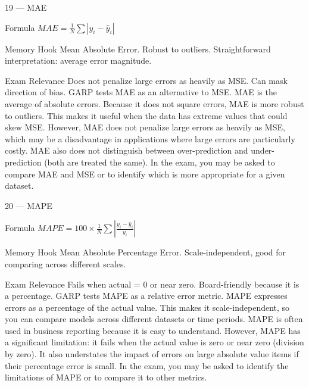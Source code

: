 \documentclass[aspectratio=169,8pt]{beamer}
\begin{document}
	\begin{frame}{19 --- MAE}
		\begin{block}{Formula}
			$MAE = \frac{1}{N}\sum|y_i - \hat{y}_i|$
		\end{block}
		\begin{block}{Memory Hook}
			Mean Absolute Error. Robust to outliers. Straightforward interpretation: average error magnitude.
		\end{block}
		\begin{block}{Exam Relevance}
			Does not penalize large errors as heavily as MSE. Can mask direction of bias. GARP tests MAE as an alternative to MSE. MAE is the average of absolute errors. Because it does not square errors, MAE is more robust to outliers. This makes it useful when the data has extreme values that could skew MSE. However, MAE does not penalize large errors as heavily as MSE, which may be a disadvantage in applications where large errors are particularly costly. MAE also does not distinguish between over-prediction and under-prediction (both are treated the same). In the exam, you may be asked to compare MAE and MSE or to identify which is more appropriate for a given dataset.
		\end{block}
	\end{frame}
	
	\begin{frame}{20 --- MAPE}
		\begin{block}{Formula}
			$MAPE = 100 \times \frac{1}{N}\sum\left|\frac{y_i - \hat{y}_i}{y_i}\right|$
		\end{block}
		\begin{block}{Memory Hook}
			Mean Absolute Percentage Error. Scale-independent, good for comparing across different scales.
		\end{block}
		\begin{block}{Exam Relevance}
			Fails when actual = 0 or near zero. Board-friendly because it is a percentage. GARP tests MAPE as a relative error metric. MAPE expresses errors as a percentage of the actual value. This makes it scale-independent, so you can compare models across different datasets or time periods. MAPE is often used in business reporting because it is easy to understand. However, MAPE has a significant limitation: it fails when the actual value is zero or near zero (division by zero). It also understates the impact of errors on large absolute value items if their percentage error is small. In the exam, you may be asked to identify the limitations of MAPE or to compare it to other metrics.
		\end{block}
	\end{frame}
	
\end{document}
